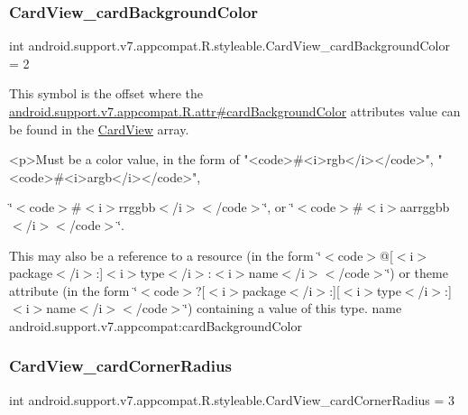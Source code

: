 \subsubsection{\texorpdfstring{Card\+View\+\_\+card\+Background\+Color}{CardView\_cardBackgroundColor}}
{\footnotesize\ttfamily int android.\+support.\+v7.\+appcompat.\+R.\+styleable.\+Card\+View\+\_\+card\+Background\+Color = 2\hspace{0.3cm}{\ttfamily [static]}}

This symbol is the offset where the \hyperlink{classandroid_1_1support_1_1v7_1_1appcompat_1_1R_1_1attr_a8af9587e6c5641d55965fddcd9ef548e}{android.\+support.\+v7.\+appcompat.\+R.\+attr\#card\+Background\+Color} attribute\textquotesingle{}s value can be found in the \hyperlink{classandroid_1_1support_1_1v7_1_1appcompat_1_1R_1_1styleable_aee2dd81febffbeeaeff51a35af0f87ec}{Card\+View} array.

\begin{DoxyVerb}      <p>Must be a color value, in the form of "<code>#<i>rgb</i></code>", "<code>#<i>argb</i></code>",
\end{DoxyVerb}
 \char`\"{}$<$code$>$\#$<$i$>$rrggbb$<$/i$>$$<$/code$>$\char`\"{}, or \char`\"{}$<$code$>$\#$<$i$>$aarrggbb$<$/i$>$$<$/code$>$\char`\"{}. 

This may also be a reference to a resource (in the form \char`\"{}$<$code$>$@\mbox{[}$<$i$>$package$<$/i$>$\+:\mbox{]}$<$i$>$type$<$/i$>$\+:$<$i$>$name$<$/i$>$$<$/code$>$\char`\"{}) or theme attribute (in the form \char`\"{}$<$code$>$?\mbox{[}$<$i$>$package$<$/i$>$\+:\mbox{]}\mbox{[}$<$i$>$type$<$/i$>$\+:\mbox{]}$<$i$>$name$<$/i$>$$<$/code$>$\char`\"{}) containing a value of this type.  name android.\+support.\+v7.\+appcompat\+:card\+Background\+Color \mbox{\label{classandroid_1_1support_1_1v7_1_1appcompat_1_1R_1_1styleable_aeaecb06443390ab0adc287eaf8376de8}} 
\subsubsection{\texorpdfstring{Card\+View\+\_\+card\+Corner\+Radius}{CardView\_cardCornerRadius}}
{\footnotesize\ttfamily int android.\+support.\+v7.\+appcompat.\+R.\+styleable.\+Card\+View\+\_\+card\+Corner\+Radius = 3\hspace{0.3cm}{\ttfamily [static]}}

